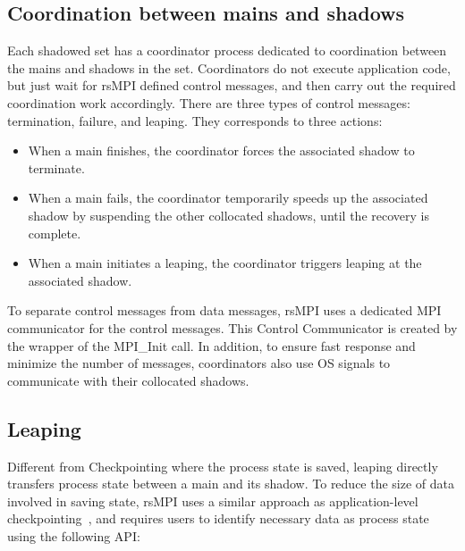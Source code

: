 \subsection{Coordination between mains and shadows}
Each shadowed set has a coordinator process dedicated to coordination between the mains and shadows in the set. 
Coordinators do not execute application code, but just wait for rsMPI defined control messages, and then carry out the required 
coordination work accordingly. There are three types of control messages: termination, failure, and leaping. They corresponds to three actions:
\begin{itemize}
  \item When a main finishes, the coordinator forces the associated shadow to terminate.
  \item When a main fails, the coordinator temporarily speeds up the associated shadow by suspending the other collocated shadows, until the recovery is complete.
  \item When a main initiates a leaping, the coordinator triggers leaping at the associated shadow.
\end{itemize}
To separate control messages from data messages, rsMPI uses a dedicated MPI communicator for the control messages. This Control Communicator is created by the wrapper of the MPI\_Init call. In addition, to ensure fast response and minimize the number of messages, coordinators also use OS signals to communicate with their collocated shadows. %


\subsection{Leaping}
Different from Checkpointing where the process state is saved, leaping directly transfers process state between a main and its shadow. 
To reduce the size of data involved in saving state, rsMPI uses a similar approach as application-level checkpointing~\cite{Beguelin97applicationlevel,ni_2013_acr}, and requires users to  identify necessary data as process state using the following API:

